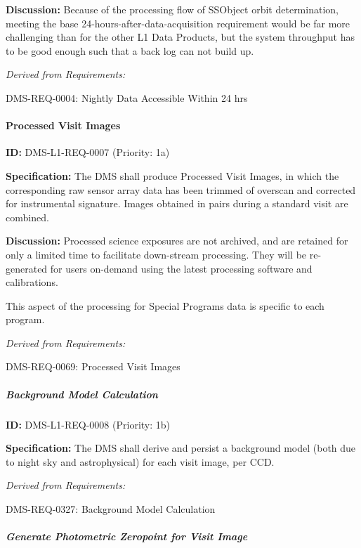 \documentclass[SE,toc,lsstdraft]{lsstdoc}
\begin{document}
\textbf{Discussion:} Because of the processing flow of SSObject orbit determination, meeting the base 24-hours-after-data-acquisition requirement would be far more challenging than for the other L1 Data Products, but the system throughput has to be good enough such that a back log can not build up.

\emph{Derived from Requirements:}

DMS-REQ-0004:
Nightly Data Accessible Within 24 hrs \newline

\paragraph{Processed Visit Images}\hfill  %

\label{DMS-L1-REQ-0007}
\textbf{ID:} DMS-L1-REQ-0007 (Priority: 1a)

\textbf{Specification: }The DMS shall produce Processed Visit Images, in which the corresponding raw sensor array data has been trimmed of overscan and corrected for instrumental signature. Images obtained in pairs during a standard visit are combined.

\textbf{Discussion:} Processed science exposures are not archived, and are retained for only a limited time to facilitate down-stream processing. They will be re-generated for users on-demand using the latest processing software and calibrations.

This aspect of the processing for Special Programs data is specific to each program.

\emph{Derived from Requirements:}

DMS-REQ-0069:
Processed Visit Images \newline

\subparagraph{Background Model Calculation}\hfill  %

\label{DMS-L1-REQ-0008}
\textbf{ID:} DMS-L1-REQ-0008 (Priority: 1b)

\textbf{Specification: }The DMS shall derive and persist a background model (both due to night sky and astrophysical) for each visit image, per CCD.

\emph{Derived from Requirements:}

DMS-REQ-0327:
Background Model Calculation \newline

\subparagraph{Generate Photometric Zeropoint for Visit Image}\hfill  %
\end{document}
